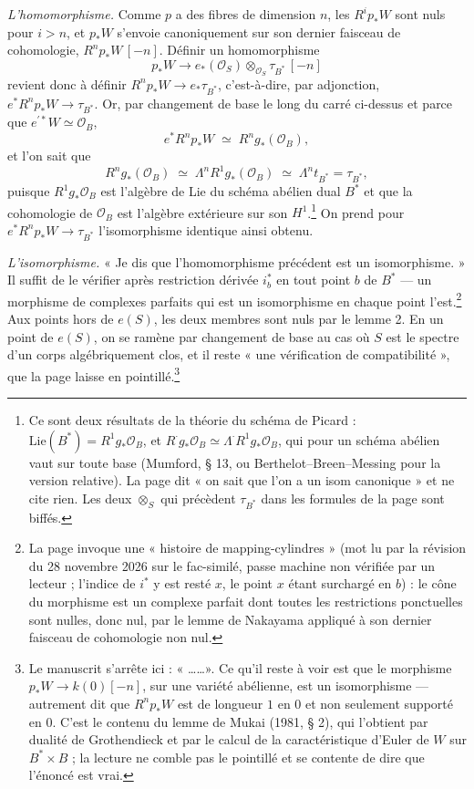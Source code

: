 \documentclass[11pt,a4paper]{article}
\begin{document}
\emph{L'homomorphisme.} Comme $p$ a des fibres de dimension $n$, les
$R^{i}p_{*}W$ sont nuls pour $i > n$, et $p_{*}W$ s'envoie canoniquement sur
son dernier faisceau de cohomologie, $R^{n}p_{*}W\,[-n]$. Définir un
homomorphisme
\[
  p_{*}W \longrightarrow e_{*}(\mathcal{O}_S) \otimes_{\mathcal{O}_S} \tau_{B^{*}}\,[-n]
\]
revient donc à définir $R^{n}p_{*}W \to e_{*}\tau_{B^{*}}$, c'est-à-dire, par
adjonction, $e^{*}R^{n}p_{*}W \to \tau_{B^{*}}$. Or, par changement de base
le long du carré ci-dessus et parce que $e^{\prime *}W \simeq \mathcal{O}_B$,
\[
  e^{*}R^{n}p_{*}W \;\simeq\; R^{n}g_{*}(\mathcal{O}_B),
\]
et l'on sait que
\[
  R^{n}g_{*}(\mathcal{O}_B) \;\simeq\; \Lambda^{n}R^{1}g_{*}(\mathcal{O}_B)
  \;\simeq\; \Lambda^{n}t_{B^{*}} = \tau_{B^{*}},
\]
puisque $R^{1}g_{*}\mathcal{O}_B$ est l'algèbre de Lie du schéma abélien dual
$B^{*}$ et que la cohomologie de $\mathcal{O}_B$ est l'algèbre extérieure sur
son $H^{1}$.\footnote{Ce sont deux résultats de la théorie du schéma de
Picard : $\mathrm{Lie}(B^{*}) = R^{1}g_{*}\mathcal{O}_B$, et $R^{\cdot}
g_{*}\mathcal{O}_B \simeq \Lambda^{\cdot}R^{1}g_{*}\mathcal{O}_B$, qui pour un
schéma abélien vaut sur toute base (Mumford, § 13, ou Berthelot--Breen--Messing
pour la version relative). La page dit « on sait que l'on a un isom
canonique » et ne cite rien. Les deux $\otimes_S$ qui précèdent $\tau_{B^{*}}$
dans les formules de la page sont biffés.} On prend pour
$e^{*}R^{n}p_{*}W \to \tau_{B^{*}}$ l'isomorphisme identique ainsi obtenu.

\emph{L'isomorphisme.} « Je dis que l'homomorphisme précédent est un
isomorphisme. » Il suffit de le vérifier après restriction dérivée $i_b^{*}$
en tout point $b$ de $B^{*}$ — un morphisme de complexes parfaits qui est un
isomorphisme en chaque point l'est.\footnote{La page invoque une « histoire
de mapping-cylindres » (mot lu par la révision du 28 novembre 2026 sur le
fac-similé, passe machine non vérifiée par un lecteur ; l'indice de $i^{*}$ y
est resté $x$, le point $x$ étant surchargé en $b$) : le cône du morphisme est un
complexe parfait dont toutes les restrictions ponctuelles sont nulles, donc
nul, par le lemme de Nakayama appliqué à son dernier faisceau de cohomologie
non nul.} Aux points hors de $e(S)$, les deux membres sont nuls par le
lemme 2. En un point de $e(S)$, on se ramène par changement de base au cas où
$S$ est le spectre d'un corps algébriquement clos, et il reste « une
vérification de compatibilité », que la page laisse en pointillé.\footnote{Le
manuscrit s'arrête ici : « \ldots\ldots ». Ce qu'il reste à voir est que le
morphisme $p_{*}W \to k(0)[-n]$, sur une variété abélienne, est un
isomorphisme — autrement dit que $R^{n}p_{*}W$ est de longueur $1$ en $0$ et
non seulement supporté en $0$. C'est le contenu du lemme de Mukai (1981,
§ 2), qui l'obtient par dualité de Grothendieck et par le calcul de la
caractéristique d'Euler de $W$ sur $B^{*} \times B$ ; la lecture ne comble pas
le pointillé et se contente de dire que l'énoncé est vrai.}
\end{document}
